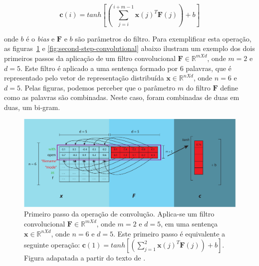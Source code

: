 \begin{equation}\label{eq:calc_convolution_ci}
    \bm{c}(i) = tanh \left[\left(\sum_{j=i}^{i + m - 1} \bm{x}(j)^{T}\bm{F}(j)\right) + b\right]
\end{equation}

onde $b$ é o \textit{bias} e $\bm{F}$ e $b$ são parâmetros do filtro. Para exemplificar esta operação, as figuras~\ref{fig:first-step-convolutional} e \ref{fig:second-step-convolutional} abaixo ilustram um exemplo dos dois primeiros passos da aplicação de um filtro convolucional $\bm{F} \in \mathbb{R}^{m X d}$, onde $m = 2$ e $d = 5$. Este filtro é aplicado a uma sentença formado por 6 palavras, que é representado pelo vetor de representação distribuída $\bm{x} \in \mathbb{R}^{n X d}$, onde $n = 6$ e $d = 5$. Pelas figuras, podemos perceber que o parâmetro $m$ do filtro $\bm{F}$ define como as palavras são combinadas. Neste caso, foram combinadas de duas em duas, um bi-gram.

\begin{figure}[h]
    \centering
    \includegraphics[width=1\textwidth]{figuras/cap-problema/first-step-convolution.pdf}
    \caption{Primeiro passo da operação de convolução. Aplica-se um filtro convolucional $\bm{F} \in \mathbb{R}^{m X d}$, onde $m = 2$ e $d = 5$, em uma sentença $\bm{x} \in \mathbb{R}^{n X d}$, onde $n = 6$ e $d = 5$. Este primeiro passo é equivalente a seguinte operação: $\bm{c}(1) = tanh \left[\left(\sum_{j=1}^{2} \bm{x}(j)^{T}\bm{F}(j)\right) + b\right]$. Figura adapatada a partir do texto de \cite{joshua-kim-cnn-understanding-word-embeddings-2019}.} 
    \label{fig:first-step-convolutional}
\end{figure}


